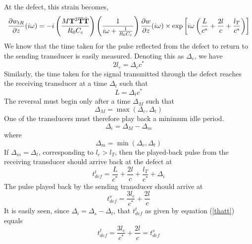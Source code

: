 \documentclass[11pt,letterpaper]{article}%
\begin{document}
At the defect, this strain becomes,
\begin{equation}
\frac{\partial { w}_{tR}}{\partial z}(i\omega) =
-i\left(\frac{M{\bf T}^2\overline{\bf T}{\hat {\bf
T}}}{R_0C_c}\right)\left(\frac{1}{i\omega +
\frac{1}{R_0C_c}}\right)\frac{\partial {w}}{\partial
z}(i\omega)\times{\exp}\left[{i\omega\left(\frac{L}{c^\ast}+
\frac{2l}{c}+ \frac{l_T}{c^\ast}\right)}\right]
\label{strplaybkdef1}
\end{equation}
%
We know that the time taken for the pulse reflected from the defect
to return to the sending transducer is easily measured.  Denoting
this as $\Delta_c$, we have
\begin{equation}
2l_c = \Delta_c c^\ast \label{speed1}
\end{equation}
Similarly, the time taken for the signal transmitted through the
defect reaches the receiving transducer at a time $\Delta_t$ such
that
\begin{equation}
L = \Delta_t c^\ast \label{speed2}
\end{equation}
The reversal must begin only after a time $\Delta_M$ such that
\begin{equation}
\Delta_M = \max(\Delta_c, \Delta_t) \label{DeltaM}
\end{equation}
%
One of the transducers must therefore play back a minimum idle
period.
\begin{equation}
\Delta_i = \Delta_M - \Delta_m \label{Deltai}
\end{equation}
where
\begin{equation}
\Delta_m = \min(\Delta_c, \Delta_t) \label{Deltam}
\end{equation}
If $\Delta_m = \Delta_t$, corresponding to $l_c > l_T$, then the
played-back pulse from the receiving transducer should arrive back
at the defect at
\begin{equation}
t^t_{def} = \frac{L}{c^\ast}+\frac{2l}{c} + \frac{l_T}{c^\ast} +
\Delta_i \label{thatt}
\end{equation}
The pulse played back by the sending transducer should arrive at
\begin{equation}
t^s_{def} = \frac{3l_c}{c^\ast} + \frac{2l}{c} \label{thats}
\end{equation}
It is easily seen, since $\Delta_i = \Delta_s - \Delta_t$, that
$t^t_{def}$ as given by equation (\ref{thatt}) equals
\begin{equation}
t^t_{def} = \frac{3l_c}{c^\ast} + \frac{2l}{c} = t^s_{def}
\label{tequal}
\end{equation}
\end{document}
